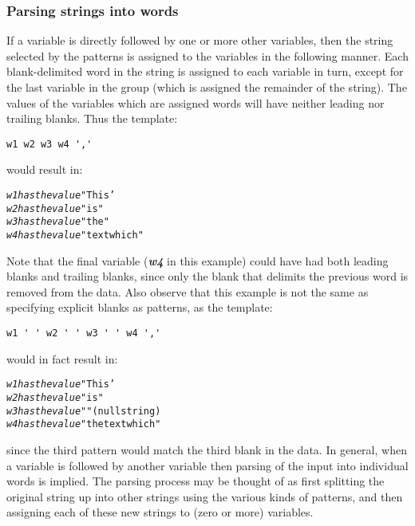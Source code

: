 \subsubsection{Parsing strings into words}
 If a variable is directly followed by one or more other variables,
then the string selected by the patterns is assigned to the variables
in the following manner.
Each blank-delimited word in the string is
assigned to each variable in turn, except for the last variable in the
group (which is assigned the remainder of the string).
The values of the variables which are assigned words will have neither
leading nor trailing blanks.
 Thus the template:
\begin{lstlisting}
w1 w2 w3 w4 ','
\end{lstlisting}
would result in:
\begin{alltt}
\emph{w1} \emph{has the value} "This'
\emph{w2} \emph{has the value} "is"
\emph{w3} \emph{has the value} "the"
\emph{w4} \emph{has the value} "text which"
\end{alltt}
Note that the final variable (\textbf{\emph{w4}} in this
example) could have had both leading blanks and trailing blanks, since
only the blank that delimits the previous word is removed from the data.
 Also observe that this example is not the same as specifying
explicit blanks as patterns, as the template:
\begin{lstlisting}
w1 ' ' w2 ' ' w3 ' ' w4 ','
\end{lstlisting}
would in fact result in:
\begin{alltt}
\emph{w1} \emph{has the value} "This'
\emph{w2} \emph{has the value} "is"
\emph{w3} \emph{has the value} ""  (null string)
\emph{w4} \emph{has the value} "the text which"
\end{alltt}
since the third pattern would match the third blank in the data.
 In general, when a variable is followed by another variable then
parsing of the input into individual words is implied.
The parsing process may be thought of as first splitting the original
string up into other strings using the various kinds of patterns, and
then assigning each of these new strings to (zero or more) variables.
